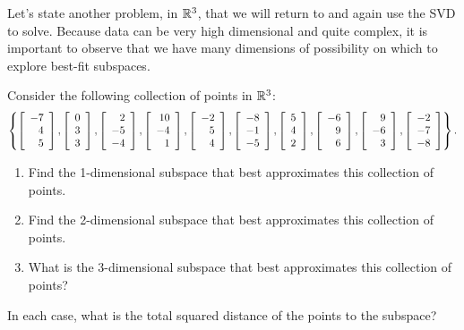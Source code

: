 \documentclass{ximera}
\begin{document}
Let's state another problem, in $\RR^3$, that we will return to and again use the SVD to solve. Because data can be very high dimensional and quite complex, it is important to observe that we have many dimensions of possibility on which to explore best-fit subspaces. 


\begin{example}\label{ex:subspace-fitting-r3}
  Consider the following collection of points in $\R^3$:
  \begin{equation*}
    \set{
      \startmat{r} -7 \\ 4 \\ 5 \stopmat,
      \startmat{r} 0 \\ 3 \\ 3 \stopmat,
      \startmat{r} 2 \\ -5 \\ -4 \stopmat,
      \startmat{r} 10 \\ -4 \\ 1 \stopmat,
      \startmat{r} -2 \\ 5 \\ 4 \stopmat,
      \startmat{r} -8 \\ -1 \\ -5 \stopmat,
      \startmat{r} 5 \\ 4 \\ 2 \stopmat,
      \startmat{r} -6 \\ 9 \\ 6 \stopmat,
      \startmat{r} 9 \\ -6 \\ 3 \stopmat,
      \startmat{r} -2 \\ -7 \\ -8 \stopmat
    }.
  \end{equation*}
    \begin{enumerate}
    \item Find the 1-dimensional subspace that best approximates this
      collection of points.
    \item Find the 2-dimensional subspace that best approximates this
      collection of points.
    \item What is the 3-dimensional subspace that best approximates this
      collection of points?
    \end{enumerate}
  In each case, what is the total squared distance of the points to
  the subspace?
\end{example}
\end{document}
